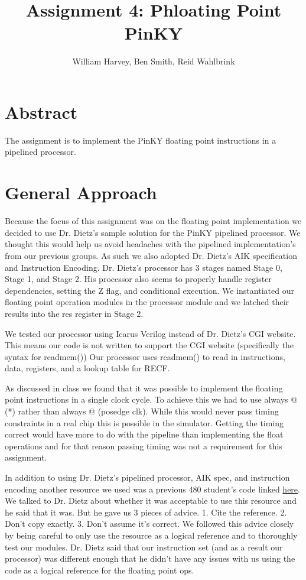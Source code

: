 \documentclass{article}
\begin{document}
\title{Assignment 4: Phloating Point PinKY}

\author{William Harvey, Ben Smith, Reid Wahlbrink}


\maketitle
\thispagestyle{empty}

\begin{multicols}{2}
\section{Abstract}
The assignment is to implement the PinKY floating point instructions in a pipelined processor.


\section{General Approach}
Because the focus of this assignment was on the floating point implementation we decided to use Dr. Dietz's sample solution for the PinKY pipelined processor. We thought this would help us avoid headaches with the pipelined implementation's from our previous groups. As such we also adopted Dr. Dietz's AIK specification and Instruction Encoding. Dr. Dietz's processor has 3 stages named Stage 0, Stage 1, and Stage 2. His processor also seems to properly handle register dependencies, setting the Z flag, and conditional execution. We instantiated our floating point operation modules in the processor module and we latched their results into the res register in Stage 2.

We tested our processor using Icarus Verilog instead of Dr. Dietz's CGI website. This means our code is not written to support the CGI website (specifically the syntax for readmem()) Our processor uses readmem() to read in instructions, data, registers, and a lookup table for RECF.

As discussed in class we found that it was possible to implement the floating point instructions in a single clock cycle. To achieve this we had to use always @ (*) rather than always @ (posedge clk). While this would never pass timing constraints in a real chip this is possible in the simulator. Getting the timing correct would have more to do with the pipeline than implementing the float operations and for that reason passing timing was not a requirement for this assignment.

In addition to using Dr. Dietz's pipelined processor, AIK spec, and instruction encoding another resource we used was a previous 480 student's code linked \href{https://github.com/darthburkhart/Project4/blob/master/floatpipe.v} {here}. We talked to Dr. Dietz about whether it was acceptable to use this resource and he said that it was. But he gave us 3 pieces of advice. 1. Cite the reference.  2. Don't copy exactly. 3. Don't assume it's correct. We followed this advice closely by being careful to only use the resource as a logical reference and to thoroughly test our modules. Dr. Dietz said that our instruction set (and as a result our processor) was different enough that he didn't have any issues with us using the code as a logical reference for the floating point ops.


\end{multicols}
\end{document}
